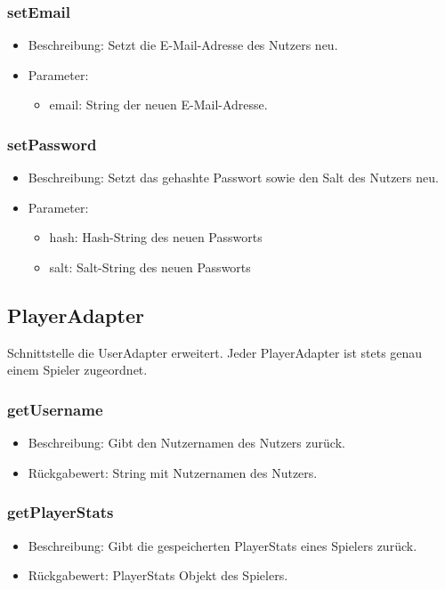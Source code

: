 \documentclass[a4paper]{scrreprt}
\begin{document}
	\subsubsection{setEmail}
	\begin{itemize}
		\item Beschreibung: Setzt die E-Mail-Adresse des Nutzers neu.
		\item Parameter:
		\begin{itemize}
			\item email: String der neuen E-Mail-Adresse.
		\end{itemize}
	\end{itemize}

	\subsubsection{setPassword}
	\begin{itemize}
		\item Beschreibung: Setzt das gehashte Passwort sowie den Salt des Nutzers neu.
		\item Parameter:
		\begin{itemize}
			\item hash: Hash-String des neuen Passworts
			\item salt: Salt-String des neuen Passworts
		\end{itemize}
	\end{itemize}

	\subsection{PlayerAdapter}
	Schnittstelle die UserAdapter erweitert.
	Jeder PlayerAdapter ist stets genau einem Spieler zugeordnet.

    \subsubsection{getUsername}
    \begin{itemize}
        \item Beschreibung: Gibt den Nutzernamen des Nutzers zurück.
        \item Rückgabewert: String mit Nutzernamen des Nutzers.
    \end{itemize}

	\subsubsection{getPlayerStats}
	\begin{itemize}
		\item Beschreibung: Gibt die gespeicherten PlayerStats eines Spielers zurück.
		\item Rückgabewert: PlayerStats Objekt des Spielers.
	\end{itemize}
\end{document}
